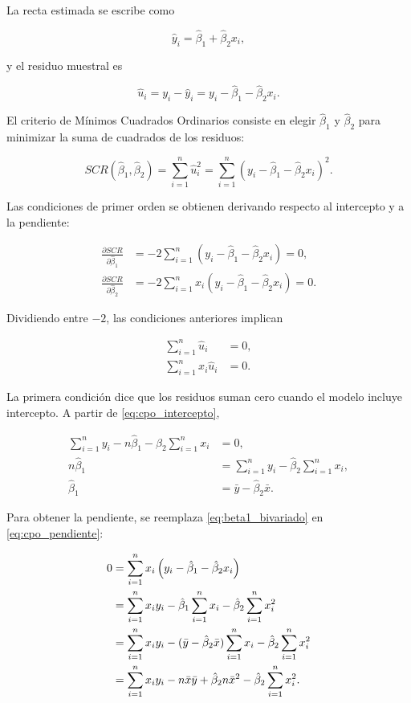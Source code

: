 \documentclass[11pt,a4paper]{article}
\begin{document}
La recta estimada se escribe como

\[
\hat{y}_i = \hat{\beta}_1+\hat{\beta}_2x_i,
\]

y el residuo muestral es

\[
\hat{u}_i = y_i-\hat{y}_i = y_i-\hat{\beta}_1-\hat{\beta}_2x_i.
\]

El criterio de Mínimos Cuadrados Ordinarios consiste en elegir \(\hat{\beta}_1\) y \(\hat{\beta}_2\) para minimizar la suma de cuadrados de los residuos:

\[
SCR(\hat{\beta}_1,\hat{\beta}_2)=\sum_{i=1}^{n}\hat{u}_i^2
=\sum_{i=1}^{n}\left(y_i-\hat{\beta}_1-\hat{\beta}_2x_i\right)^2.
\]

Las condiciones de primer orden se obtienen derivando respecto al intercepto y a la pendiente:

\begin{align}
\frac{\partial SCR}{\partial \hat{\beta}_1}
&=-2\sum_{i=1}^{n}\left(y_i-\hat{\beta}_1-\hat{\beta}_2x_i\right)=0, \label{eq:cpo_intercepto}\\
\frac{\partial SCR}{\partial \hat{\beta}_2}
&=-2\sum_{i=1}^{n}x_i\left(y_i-\hat{\beta}_1-\hat{\beta}_2x_i\right)=0. \label{eq:cpo_pendiente}
\end{align}

Dividiendo entre \(-2\), las condiciones anteriores implican

\begin{align}
\sum_{i=1}^{n}\hat{u}_i &=0, \\
\sum_{i=1}^{n}x_i\hat{u}_i &=0.
\end{align}

La primera condición dice que los residuos suman cero cuando el modelo incluye intercepto. A partir de \eqref{eq:cpo_intercepto},

\begin{align}
\sum_{i=1}^{n}y_i-n\hat{\beta}_1-\hat{\beta}_2\sum_{i=1}^{n}x_i&=0, \\
n\hat{\beta}_1&=\sum_{i=1}^{n}y_i-\hat{\beta}_2\sum_{i=1}^{n}x_i, \\
\hat{\beta}_1&=\bar{y}-\hat{\beta}_2\bar{x}. \label{eq:beta1_bivariado}
\end{align}

Para obtener la pendiente, se reemplaza \eqref{eq:beta1_bivariado} en \eqref{eq:cpo_pendiente}:

\begin{align}
0&=\sum_{i=1}^{n}x_i\left(y_i-\hat{\beta}_1-\hat{\beta}_2x_i\right) \notag \\
&=\sum_{i=1}^{n}x_iy_i-\hat{\beta}_1\sum_{i=1}^{n}x_i-\hat{\beta}_2\sum_{i=1}^{n}x_i^2 \notag \\
&=\sum_{i=1}^{n}x_iy_i-(\bar{y}-\hat{\beta}_2\bar{x})\sum_{i=1}^{n}x_i-\hat{\beta}_2\sum_{i=1}^{n}x_i^2 \notag \\
&=\sum_{i=1}^{n}x_iy_i-n\bar{x}\bar{y}+\hat{\beta}_2n\bar{x}^{2}-\hat{\beta}_2\sum_{i=1}^{n}x_i^2. \notag
\end{align}
\end{document}
